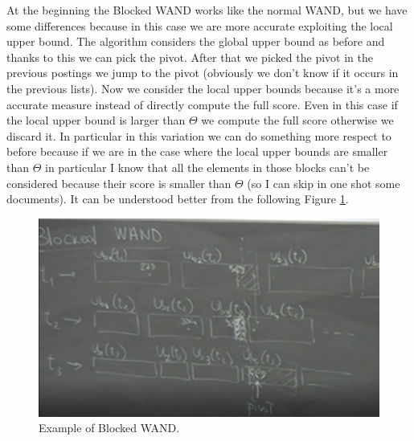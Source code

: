 At the beginning the Blocked WAND works like the normal WAND, but we have some differences because in this case we are more accurate exploiting the local upper bound.\newline
The algorithm considers the global upper bound as before and thanks to this we can pick the pivot. After that we picked the pivot in the previous postings we jump to the pivot (obviously we don't know if it occurs in the previous lists). Now we consider the local upper bounds because it's a more accurate measure instead of directly compute the full score. Even in this case if the local upper bound is larger than $\Theta$ we compute the full score otherwise we discard it.\newline
In particular in this variation we can do something more respect to before because if we are in the case where the local upper bounds are smaller than $\Theta$ in particular I know that all the elements in those blocks can't be considered because their score is smaller than $\Theta$ (so I can skip in one shot some documents). It can be understood better from the following Figure \ref{fig:blockedwand}.\newline
\begin{figure}
    \centering
    \includegraphics[width=0.75\linewidth]{images/blockedwand.PNG}
    \caption{Example of Blocked WAND.}
    \label{fig:blockedwand}
\end{figure}
